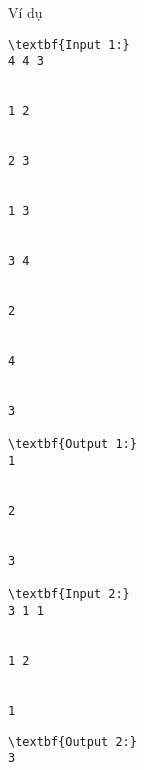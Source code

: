 Ví dụ
\begin{verbatim}
\textbf{Input 1:}
4 4 3


1 2


2 3


1 3


3 4


2


4


3

\textbf{Output 1:}
1


2


3

\textbf{Input 2:}
3 1 1


1 2


1 \end{verbatim}
\begin{verbatim}
\textbf{Output 2:}
3\end{verbatim}